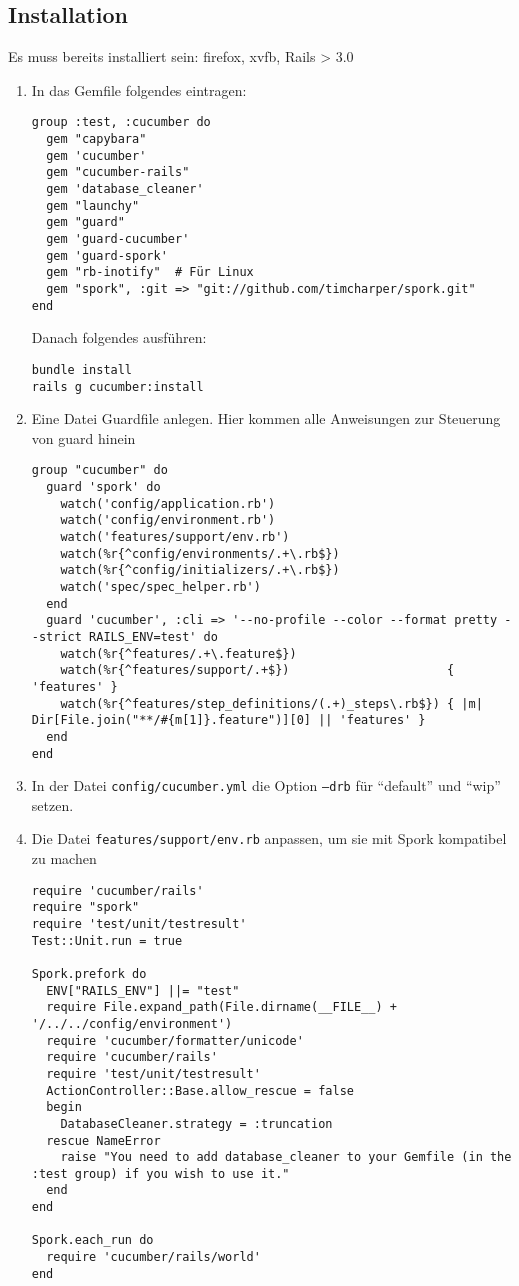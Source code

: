 \subsection*{Installation}
Es muss bereits installiert sein: firefox, xvfb, Rails > 3.0
\begin{enumerate}
 \item In das Gemfile folgendes eintragen:
 \begin{lstlisting}[caption=RAILS\_ROOT/Gemfile]
group :test, :cucumber do
  gem "capybara"
  gem 'cucumber'
  gem "cucumber-rails"
  gem 'database_cleaner'
  gem "launchy"
  gem "guard"
  gem 'guard-cucumber'
  gem 'guard-spork'
  gem "rb-inotify"  # Für Linux
  gem "spork", :git => "git://github.com/timcharper/spork.git"
end

 \end{lstlisting}
 Danach folgendes ausführen:

 \begin{verbatim}
bundle install
rails g cucumber:install
 \end{verbatim}


 \item Eine Datei Guardfile anlegen. Hier kommen alle Anweisungen zur Steuerung von guard hinein
 \begin{lstlisting}[caption=RAILS\_ROOT/Guardfile]
group "cucumber" do
  guard 'spork' do
    watch('config/application.rb')
    watch('config/environment.rb')
    watch('features/support/env.rb')
    watch(%r{^config/environments/.+\.rb$})
    watch(%r{^config/initializers/.+\.rb$})
    watch('spec/spec_helper.rb')
  end
  guard 'cucumber', :cli => '--no-profile --color --format pretty --strict RAILS_ENV=test' do
    watch(%r{^features/.+\.feature$})
    watch(%r{^features/support/.+$})                      { 'features' }
    watch(%r{^features/step_definitions/(.+)_steps\.rb$}) { |m| Dir[File.join("**/#{m[1]}.feature")][0] || 'features' }
  end
end
\end{lstlisting}
\item In der Datei \texttt{config/cucumber.yml} die Option \texttt{--drb} für "`default"' und "`wip"' setzen.


\item Die Datei \texttt{features/support/env.rb} anpassen, um sie mit Spork kompatibel zu machen
\begin{lstlisting}[caption=features/support/env.rb]
require 'cucumber/rails'
require "spork"
require 'test/unit/testresult'
Test::Unit.run = true

Spork.prefork do
  ENV["RAILS_ENV"] ||= "test"
  require File.expand_path(File.dirname(__FILE__) + '/../../config/environment')
  require 'cucumber/formatter/unicode'
  require 'cucumber/rails'
  require 'test/unit/testresult'
  ActionController::Base.allow_rescue = false
  begin
    DatabaseCleaner.strategy = :truncation
  rescue NameError
    raise "You need to add database_cleaner to your Gemfile (in the :test group) if you wish to use it."
  end
end

Spork.each_run do
  require 'cucumber/rails/world'
end

\end{lstlisting}

\end{enumerate}



